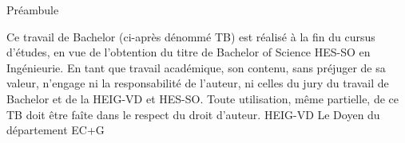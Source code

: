 \vfill
\begin{center}
    \Huge Préambule
\end{center}
\vspace{1cm}
Ce travail de Bachelor (ci-après dénommé TB) est réalisé à la fin du cursus d'études, en vue de l'obtention du titre de Bachelor of Science HES-SO en Ingénieurie.
\newline \newline
En tant que travail académique, son contenu, sans préjuger de sa valeur, n'engage ni la responsabilité de l'auteur, ni celles du jury du travail de Bachelor et de la HEIG-VD et HES-SO.
\newline \newline
Toute utilisation, même partielle, de ce TB doit être faîte dans le respect du droit d'auteur.
\vspace{1cm}
HEIG-VD
Le Doyen du département EC+G
\vfill